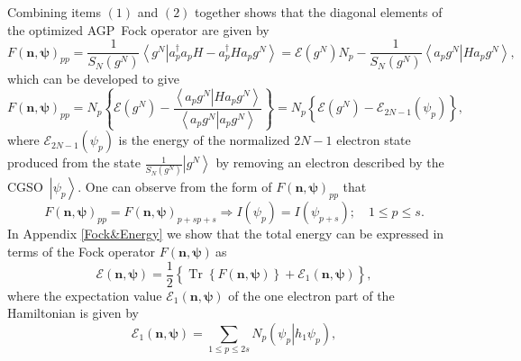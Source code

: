 \documentclass[aps,preprint]{revtex4}%
\begin{document}
Combining items $\left(  1\right)  $ and $\left(  2\right)  $ together shows
that the diagonal elements of the optimized AGP\ Fock operator are given by
\begin{equation}
F\left(  \mathbf{n},\mathbf{\psi}\right)  _{pp}=\frac{1}{S_{N}\left(
g^{N}\right)  }\left\langle \left.  g^{N}\right\vert a_{p}^{\dagger}%
a_{p}H-a_{p}^{\dagger}Ha_{p}g^{N}\right\rangle =\mathcal{E}\left(
g^{N}\right)  N_{p}-\frac{1}{S_{N}\left(  g^{N}\right)  }\left\langle \left.
a_{p}g^{N}\right\vert Ha_{p}g^{N}\right\rangle ,
\end{equation}
which can be developed to give
\begin{equation}
F\left(  \mathbf{n},\mathbf{\psi}\right)  _{pp}=N_{p}\left\{  \mathcal{E}%
\left(  g^{N}\right)  -\frac{\left\langle \left.  a_{p}g^{N}\right\vert
Ha_{p}g^{N}\right\rangle }{\left\langle \left.  a_{p}g^{N}\right\vert
a_{p}g^{N}\right\rangle }\right\}  =N_{p}\left\{  \mathcal{E}\left(
g^{N}\right)  -\mathcal{E}_{2N-1}\left(  \psi_{p}\right)  \right\}  ,
\end{equation}
where $\mathcal{E}_{2N-1}\left(  \psi_{p}\right)  $ is the energy of the
normalized $2N-1$ electron state produced from the state $\frac{1}%
{S_{N}\left(  g^{N}\right)  }\left\vert g^{N}\right\rangle $ by removing an
electron described by the CGSO\ $\left\vert \psi_{p}\right\rangle $. One can
observe from the form of $F\left(  \mathbf{n},\mathbf{\psi}\right)  _{pp}$
that
\begin{equation}
F\left(  \mathbf{n},\mathbf{\psi}\right)  _{pp}=F\left(  \mathbf{n}%
,\mathbf{\psi}\right)  _{p+sp+s}\Rightarrow I\left(  \psi_{p}\right)
=I\left(  \psi_{p+s}\right)  ;\quad1\leq p\leq s.
\end{equation}
In Appendix \ref{Fock&Energy} we show that the total energy can be expressed
in terms of the Fock operator $F\left(  \mathbf{n},\mathbf{\psi}\right)
\ $as
\begin{equation}
\mathcal{E}\left(  \mathbf{n},\mathbf{\psi}\right)  =\frac{1}{2}\left\{
\overset{}{\operatorname{Tr}\left\{  F\left(  \mathbf{n},\mathbf{\psi}\right)
\right\}  +\mathcal{E}_{1}\left(  \mathbf{n},\mathbf{\psi}\right)  }\right\}
,
\end{equation}
where the expectation value $\mathcal{E}_{1}\left(  \mathbf{n},\mathbf{\psi
}\right)  $ of the one electron part of the Hamiltonian is given by
\begin{equation}
\mathcal{E}_{1}\left(  \mathbf{n},\mathbf{\psi}\right)  =\sum_{1\leq p\leq
2s}N_{p}\left(  \left.  \psi_{p}\right\vert h_{1}\psi_{p}\right)  ,
\end{equation}
\end{document}
